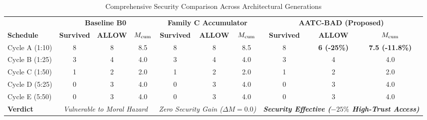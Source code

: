 \begin{table}[t]
\centering
\caption{Comprehensive Security Comparison Across Architectural Generations}
\label{tab:security_comparison}
\small
\begin{tabular}{l|ccc|ccc|ccc}
\hline
& \multicolumn{3}{c|}{\textbf{Baseline B0}} & \multicolumn{3}{c|}{\textbf{Family C Accumulator}} & \multicolumn{3}{c}{\textbf{AATC-BAD (Proposed)}} \\
\textbf{Schedule} & \textbf{Survived} & \textbf{ALLOW} & \textbf{$M_{\rm cum}$} & \textbf{Survived} & \textbf{ALLOW} & \textbf{$M_{\rm cum}$} & \textbf{Survived} & \textbf{ALLOW} & \textbf{$M_{\rm cum}$} \\
\hline
Cycle A (1:10) & 8 & 8 & 8.5 & 8 & 8 & 8.5 & 8 & \textbf{6 (-25\%)} & \textbf{7.5 (-11.8\%)} \\
Cycle B (1:25) & 3 & 4 & 4.0 & 3 & 4 & 4.0 & 3 & 4 & 4.0 \\
Cycle C (1:50) & 1 & 2 & 2.0 & 1 & 2 & 2.0 & 1 & 2 & 2.0 \\
Cycle D (5:25) & 0 & 3 & 4.0 & 0 & 3 & 4.0 & 0 & 3 & 4.0 \\
Cycle E (5:50) & 0 & 3 & 4.0 & 0 & 3 & 4.0 & 0 & 3 & 4.0 \\
\hline
\textbf{Verdict} & \multicolumn{3}{c|}{\textit{Vulnerable to Moral Hazard}} & \multicolumn{3}{c|}{\textit{Zero Security Gain ($\Delta M=0.0$)}} & \multicolumn{3}{c}{\textit{\textbf{Security Effective ($-25\%$ High-Trust Access)}}} \\
\hline
\end{tabular}
\end{table}
